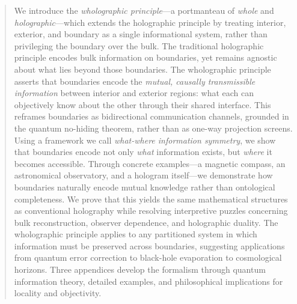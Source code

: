 ﻿\documentclass[12pt]{article}
\begin{document}
\begin{abstract}
We introduce the \emph{wholographic principle}---a portmanteau of \emph{whole} and \emph{holographic}---which extends the holographic principle by treating interior, exterior, and boundary as a single informational system, rather than privileging the boundary over the bulk. The traditional holographic principle encodes bulk information on boundaries, yet remains agnostic about what lies beyond those boundaries.
The wholographic principle asserts that boundaries encode the \emph{mutual, causally transmissible information} between interior and exterior regions: what each can objectively know about the other through their shared interface. This reframes boundaries as bidirectional communication channels, grounded in the quantum no-hiding theorem, rather than as one-way projection screens.
Using a framework we call \emph{what-where information symmetry}, we show that boundaries encode not only \emph{what} information exists, but \emph{where} it becomes accessible. Through concrete examples---a magnetic compass, an astronomical observatory, and a hologram itself---we demonstrate how boundaries naturally encode mutual knowledge rather than ontological completeness. We prove that this yields the same mathematical structures as conventional holography while resolving interpretive puzzles concerning bulk reconstruction, observer dependence, and holographic duality.
The wholographic principle applies to any partitioned system in which information must be preserved across boundaries, suggesting applications from quantum error correction to black-hole evaporation to cosmological horizons. Three appendices develop the formalism through quantum information theory, detailed examples, and philosophical implications for locality and objectivity.
\end{abstract}
\end{document}
